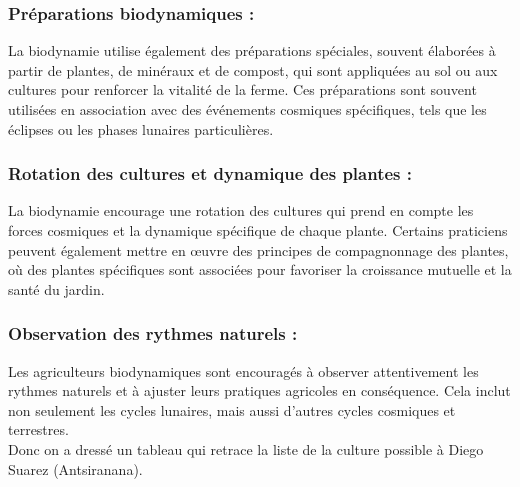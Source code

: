    \subsubsection{Préparations biodynamiques : }La biodynamie utilise également des préparations spéciales, souvent élaborées à partir de plantes, de minéraux et de compost, qui sont appliquées au sol ou aux cultures pour renforcer la vitalité de la ferme. Ces préparations sont souvent utilisées en association avec des événements cosmiques spécifiques, tels que les éclipses ou les phases lunaires particulières.\\
    \subsubsection{Rotation des cultures et dynamique des plantes :  } La biodynamie encourage une rotation des cultures qui prend en compte les forces cosmiques et la dynamique spécifique de chaque plante. Certains praticiens peuvent également mettre en œuvre des principes de compagnonnage des plantes, où des plantes spécifiques sont associées pour favoriser la croissance mutuelle et la santé du jardin.\\
    \subsubsection{Observation des rythmes naturels :} Les agriculteurs biodynamiques sont encouragés à observer attentivement les rythmes naturels et à ajuster leurs pratiques agricoles en conséquence. Cela inclut non seulement les cycles lunaires, mais aussi d'autres cycles cosmiques et terrestres.\\
Donc on a dressé un tableau qui retrace la liste de la culture possible à Diego Suarez (Antsiranana).

